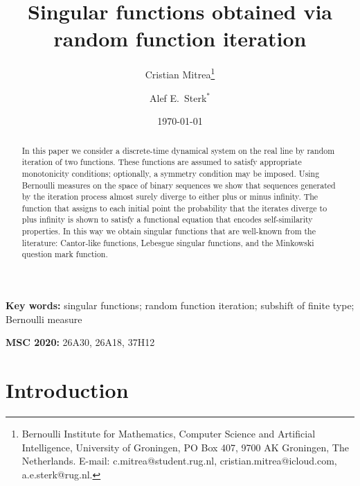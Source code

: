 \documentclass[a4paper,12pt]{article}
\author{Cristian Mitrea\footnote{Bernoulli Institute for Mathematics, Computer Science and Artificial Intelligence, University of Groningen, PO Box 407, 9700 AK Groningen, The Netherlands. E-mail: c.mitrea@student.rug.nl, cristian.mitrea@icloud.com, a.e.sterk@rug.nl.} \and Alef E.~Sterk$^*$}
\title{Singular functions obtained via \\ random function iteration}
\date{\today}
\begin{document}
\maketitle

\begin{abstract}
In this paper we consider a discrete-time dynamical system on the real line by random iteration of two functions. These functions are assumed to satisfy appropriate monotonicity conditions; optionally, a symmetry condition may be imposed. Using Bernoulli measures on the space of binary sequences we show that sequences generated by the iteration process almost surely diverge to either plus or minus infinity. The function that assigns to each initial point the probability that the iterates diverge to plus infinity is shown to satisfy a functional equation that encodes self-similarity properties. In this way we obtain singular functions that are well-known from the literature: Cantor-like functions, Lebesgue singular functions, and the Minkowski question mark function.
\end{abstract}

\textbf{Key words:} singular functions; random function iteration; subshift of finite type; Bernoulli measure

\textbf{MSC 2020:}
26A30,	%
26A18,	%
37H12	%




\newpage

\tableofcontents


\newpage


\section{Introduction}
\label{sec:intro}
\end{document}

